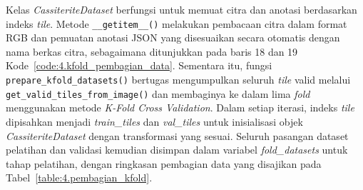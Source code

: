 Kelas \textit{CassiteriteDataset} berfungsi untuk memuat citra dan anotasi berdasarkan indeks \textit{tile}. Metode \texttt{\_\_getitem\_\_()} melakukan pembacaan citra dalam format RGB dan pemuatan anotasi JSON yang disesuaikan secara otomatis dengan nama berkas citra, sebagaimana ditunjukkan pada baris 18 dan 19 Kode~\ref{code:4.kfold_pembagian_data}. Sementara itu, fungsi \texttt{prepare\_kfold\_datasets()} bertugas mengumpulkan seluruh \textit{tile} valid melalui \texttt{get\_valid\_tiles\_from\_image()} dan membaginya ke dalam lima \textit{fold} menggunakan metode \textit{K-Fold Cross Validation}. Dalam setiap iterasi, indeks \textit{tile} dipisahkan menjadi \textit{train\_tiles} dan \textit{val\_tiles} untuk inisialisasi objek \textit{CassiteriteDataset} dengan transformasi yang sesuai. Seluruh pasangan dataset pelatihan dan validasi kemudian disimpan dalam variabel \textit{fold\_datasets} untuk tahap pelatihan, dengan ringkasan pembagian data yang disajikan pada Tabel~\ref{table:4.pembagian_kfold}. \par

